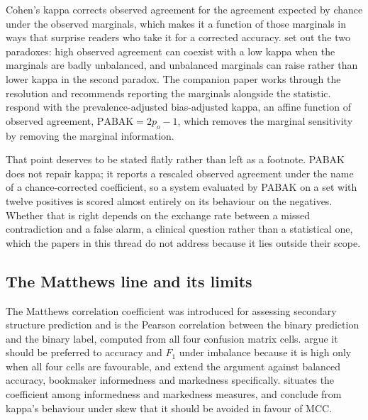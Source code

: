 Cohen's kappa \citep{cohen1960kappa} corrects observed agreement for the agreement expected
by chance under the observed marginals, which makes it a function of those marginals in ways
that surprise readers who take it for a corrected accuracy. \citet{feinstein1990paradoxes}
set out the two paradoxes: high observed agreement can coexist with a low kappa when the
marginals are badly unbalanced, and unbalanced marginals can raise rather than lower kappa in
the second paradox. The companion paper \citep{cicchetti1990resolving} works through the
resolution and recommends reporting the marginals alongside the statistic.
\citet{byrt1993pabak} respond with the prevalence-adjusted bias-adjusted kappa, an affine
function of observed agreement, $\mathrm{PABAK} = 2p_o - 1$, which removes the marginal
sensitivity by removing the marginal information.

That point deserves to be stated flatly rather than left as a footnote. PABAK does not repair
kappa; it reports a rescaled observed agreement under the name of a chance-corrected
coefficient, so a system evaluated by PABAK on a set with twelve positives is scored almost
entirely on its behaviour on the negatives. Whether that is right depends on the exchange
rate between a missed contradiction and a false alarm, a clinical question rather than a
statistical one, which the papers in this thread do not address because it lies outside their
scope.

\subsection{The Matthews line and its limits}

The Matthews correlation coefficient was introduced for assessing secondary structure
prediction \citep{matthews1975mcc} and is the Pearson correlation between the binary
prediction and the binary label, computed from all four confusion matrix cells.
\citet{chicco2020mcc} argue it should be preferred to accuracy and $F_1$ under imbalance
because it is high only when all four cells are favourable, and
\citet{chicco2021mccbalanced} extend the argument against balanced accuracy, bookmaker
informedness and markedness specifically. \citet{powers2011evaluation} situates the
coefficient among informedness and markedness measures, and \citet{delgado2019kappa} conclude
from kappa's behaviour under skew that it should be avoided in favour of MCC.

